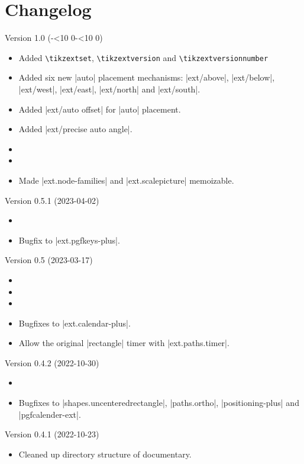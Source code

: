 \section*{Changelog}
\begin{multicols}{2}\raggedright
\noindent
Version 1.0 (\the\year-\ifnum\month<10 0\fi\the\month-\ifnum\day<10 0\fi\the\day)
\begin{itemize}
\item Added \texttt{\textbackslash tikzextset},
            \texttt{\textbackslash tikzextversion} and
            \texttt{\textbackslash tikzextversionnumber}
\item Added six new |auto| placement mechanisms:
      |ext/above|, |ext/below|, |ext/west|, |ext/east|, |ext/north| and |ext/south|.
\item Added |ext/auto offset| for |auto| placement.
\item Added |ext/precise auto angle|.
\item {}
\item {}
\item Made |ext.node-families| and |ext.scalepicture| memoizable.
\end{itemize}
Version 0.5.1 (2023-04-02)
\begin{itemize}
\item {}
\item Bugfix to |ext.pgfkeys-plus|. \cite{GH6}
\end{itemize}
Version 0.5 (2023-03-17)
\begin{itemize}
\item {}
\item {}
\item {}
\item Bugfixes to |ext.calendar-plus|.
\item Allow the original |rectangle| timer with |ext.paths.timer|.
\end{itemize}
Version 0.4.2 (2022-10-30)
\begin{itemize}
\item {}
\item Bugfixes to |shapes.uncenteredrectangle|, |paths.ortho|, |positioning-plus| and |pgfcalender-ext|.
\end{itemize}
Version 0.4.1 (2022-10-23)
\begin{itemize}
\item Cleaned up directory structure of documentary.

\end{itemize}
\end{multicols}
